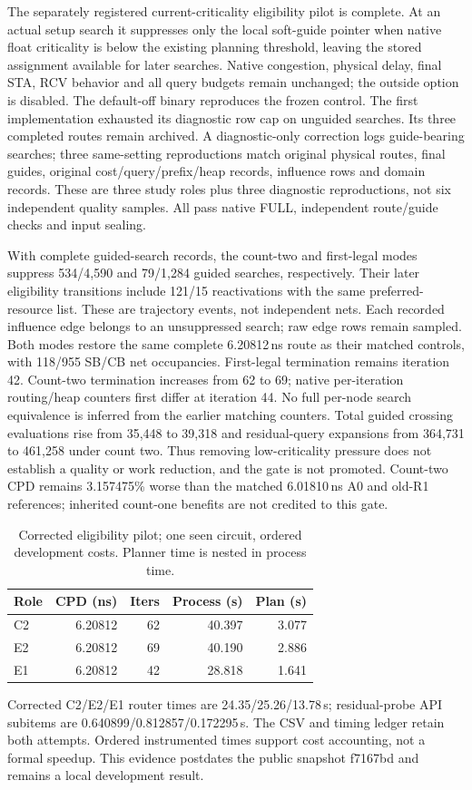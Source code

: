 The separately registered current-criticality eligibility pilot is complete. At an actual setup search it suppresses only the local soft-guide pointer when native float criticality is below the existing planning threshold, leaving the stored assignment available for later searches. Native congestion, physical delay, final STA, RCV behavior and all query budgets remain unchanged; the outside option is disabled. The default-off binary reproduces the frozen control. The first implementation exhausted its diagnostic row cap on unguided searches. Its three completed routes remain archived. A diagnostic-only correction logs guide-bearing searches; three same-setting reproductions match original physical routes, final guides, original cost/query/prefix/heap records, influence rows and domain records. These are three study roles plus three diagnostic reproductions, not six independent quality samples. All pass native FULL, independent route/guide checks and input sealing.

With complete guided-search records, the count-two and first-legal modes suppress 534/4,590 and 79/1,284 guided searches, respectively. Their later eligibility transitions include 121/15 reactivations with the same preferred-resource list. These are trajectory events, not independent nets. Each recorded influence edge belongs to an unsuppressed search; raw edge rows remain sampled. Both modes restore the same complete 6.20812\,ns route as their matched controls, with 118/955 SB/CB net occupancies. First-legal termination remains iteration 42. Count-two termination increases from 62 to 69; native per-iteration routing/heap counters first differ at iteration 44. No full per-node search equivalence is inferred from the earlier matching counters. Total guided crossing evaluations rise from 35,448 to 39,318 and residual-query expansions from 364,731 to 461,258 under count two. Thus removing low-criticality pressure does not establish a quality or work reduction, and the gate is not promoted. Count-two CPD remains 3.157475\% worse than the matched 6.01810\,ns A0 and old-R1 references; inherited count-one benefits are not credited to this gate.

\begin{table}[t]
\centering
\caption{Corrected eligibility pilot; one seen circuit, ordered development costs. Planner time is nested in process time.}
\label{tab:current-eligibility-v14}
\begin{tabular}{lrrrr}
\hline
Role & CPD (ns) & Iters & Process (s) & Plan (s)\\
\hline
C2 & 6.20812 & 62 & 40.397 & 3.077 \\
E2 & 6.20812 & 69 & 40.190 & 2.886 \\
E1 & 6.20812 & 42 & 28.818 & 1.641 \\
\hline
\end{tabular}
\end{table}

Corrected C2/E2/E1 router times are 24.35/25.26/13.78\,s; residual-probe API subitems are 0.640899/0.812857/0.172295\,s. The CSV and timing ledger retain both attempts. Ordered instrumented times support cost accounting, not a formal speedup. This evidence postdates the public snapshot f7167bd and remains a local development result.
